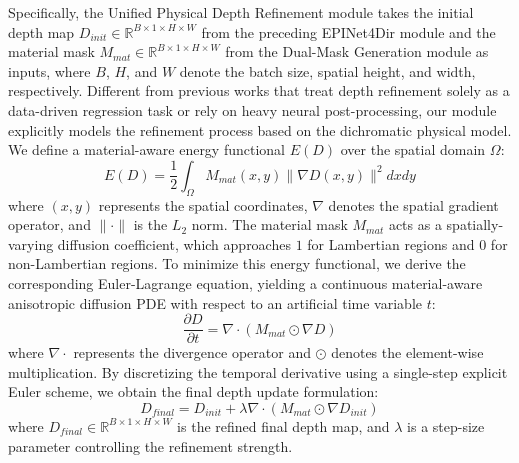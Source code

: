 Specifically, the Unified Physical Depth Refinement module takes the initial depth map $D_{init} \in \mathbb{R}^{B \times 1 \times H \times W}$ from the preceding EPINet4Dir module and the material mask $M_{mat} \in \mathbb{R}^{B \times 1 \times H \times W}$ from the Dual-Mask Generation module as inputs, where $B$, $H$, and $W$ denote the batch size, spatial height, and width, respectively. Different from previous works that treat depth refinement solely as a data-driven regression task or rely on heavy neural post-processing, our module explicitly models the refinement process based on the dichromatic physical model. We define a material-aware energy functional $E(D)$ over the spatial domain $\Omega$:
\begin{equation}
\label{eq:eq43}
E(D) = \frac{1}{2} \int_{\Omega} M_{mat}(x,y) \|\nabla D(x,y)\|^2 dx dy
\end{equation}
where $(x,y)$ represents the spatial coordinates, $\nabla$ denotes the spatial gradient operator, and $\|\cdot\|$ is the $L_2$ norm. The material mask $M_{mat}$ acts as a spatially-varying diffusion coefficient, which approaches $1$ for Lambertian regions and $0$ for non-Lambertian regions. To minimize this energy functional, we derive the corresponding Euler-Lagrange equation, yielding a continuous material-aware anisotropic diffusion PDE with respect to an artificial time variable $t$:
\begin{equation}
\label{eq:eq44}
\frac{\partial D}{\partial t} = \nabla \cdot (M_{mat} \odot \nabla D)
\end{equation}
where $\nabla \cdot$ represents the divergence operator and $\odot$ denotes the element-wise multiplication. By discretizing the temporal derivative using a single-step explicit Euler scheme, we obtain the final depth update formulation:
\begin{equation}
\label{eq:eq45}
D_{final} = D_{init} + \lambda \nabla \cdot (M_{mat} \odot \nabla D_{init})
\end{equation}
where $D_{final} \in \mathbb{R}^{B \times 1 \times H \times W}$ is the refined final depth map, and $\lambda$ is a step-size parameter controlling the refinement strength. 


